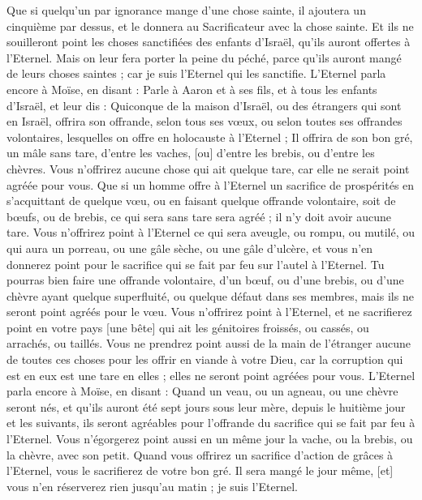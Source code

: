 \begin{multicols}{2}
Que si quelqu'un par ignorance mange d'une chose sainte, il ajoutera un cinquième par dessus, et le donnera au Sacrificateur avec la chose sainte.
Et ils ne souilleront point les choses sanctifiées des enfants d'Israël, qu'ils auront offertes à l'Eternel.
Mais on leur fera porter la peine du péché, parce qu'ils auront mangé de leurs choses saintes ; car je suis l'Eternel qui les sanctifie.
L'Eternel parla encore à Moïse, en disant :
Parle à Aaron et à ses fils, et à tous les enfants d'Israël, et leur dis : Quiconque de la maison d'Israël, ou des étrangers qui sont en Israël, offrira son offrande, selon tous ses vœux, ou selon toutes ses offrandes volontaires, lesquelles on offre en holocauste à l'Eternel ;
Il offrira de son bon gré, un mâle sans tare, d'entre les vaches, [ou] d'entre les brebis, ou d'entre les chèvres.
Vous n'offrirez aucune chose qui ait quelque tare, car elle ne serait point agréée pour vous.
Que si un homme offre à l'Eternel un sacrifice de prospérités en s'acquittant de quelque vœu, ou en faisant quelque offrande volontaire, soit de bœufs, ou de brebis, ce qui sera sans tare sera agréé ; il n'y doit avoir aucune tare.
Vous n'offrirez point à l'Eternel ce qui sera aveugle, ou rompu, ou mutilé, ou qui aura un porreau, ou une gâle sèche, ou une gâle d'ulcère, et vous n'en donnerez point pour le sacrifice qui se fait par feu sur l'autel à l'Eternel.
Tu pourras bien faire une offrande volontaire, d'un bœuf, ou d'une brebis, ou d'une chèvre ayant quelque superfluité, ou quelque défaut dans ses membres, mais ils ne seront point agréés pour le vœu.
Vous n'offrirez point à l'Eternel, et ne sacrifierez point en votre pays [une bête] qui ait les génitoires froissés, ou cassés, ou arrachés, ou taillés.
Vous ne prendrez point aussi de la main de l'étranger aucune de toutes ces choses pour les offrir en viande à votre Dieu, car la corruption qui est en eux est une tare en elles ; elles ne seront point agréées pour vous.
L'Eternel parla encore à Moïse, en disant :
Quand un veau, ou un agneau, ou une chèvre seront nés, et qu'ils auront été sept jours sous leur mère, depuis le huitième jour et les suivants, ils seront agréables pour l'offrande du sacrifice qui se fait par feu à l'Eternel.
Vous n'égorgerez point aussi en un même jour la vache, ou la brebis, ou la chèvre, avec son petit.
Quand vous offrirez un sacrifice d'action de grâces à l'Eternel, vous le sacrifierez de votre bon gré.
Il sera mangé le jour même, [et] vous n'en réserverez rien jusqu'au matin ; je suis l'Eternel.

\end{multicols}
